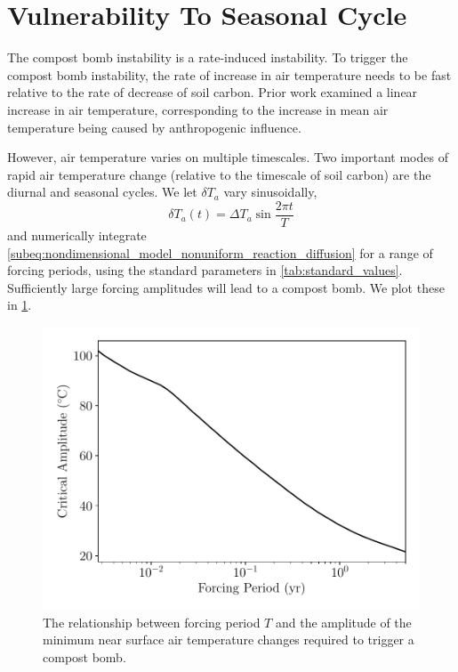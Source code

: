 \section{Vulnerability To Seasonal Cycle}
\label{sec:seasonal_cycle}
The compost bomb instability is a rate-induced instability. To trigger the compost bomb instability, the rate of increase in air temperature needs to be fast
relative to the rate of decrease of soil carbon. Prior work\cite{Luke2011} examined a linear increase in air temperature, corresponding to the increase in
mean air temperature being caused by anthropogenic influence.

However, air temperature varies on multiple timescales. Two important modes of rapid air temperature change (relative to the timescale of soil
carbon) are the diurnal and seasonal cycles. We let $\delta T_a$ vary sinusoidally,
\begin{equation}
  \label{eq:sinusoidal_forcing}
  \delta T_a(t) = \Delta T_a \sin \frac{2\pi t}{T}
\end{equation}
and numerically integrate \cref{subeq:nondimensional_model_nonuniform_reaction_diffusion} for a range of
forcing periods, using the standard parameters in \cref{tab:standard_values}. Sufficiently large forcing amplitudes will lead to a compost bomb.
We plot these in \cref{fig:forcing_frequency_vs_amplitude}.
\begin{figure}
  \centering
  \includegraphics[scale=0.5,keepaspectratio]{critical_amplitude_vs_period}
  \caption{The relationship between forcing period $T$ and the amplitude of the minimum near surface air temperature changes required to trigger a compost bomb.}
  \label{fig:forcing_frequency_vs_amplitude}
\end{figure}

